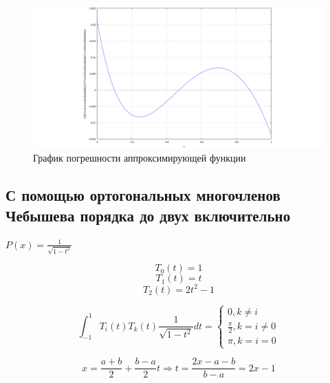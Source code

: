 \begin{figure}[H]
	\begin{center}
		\includegraphics[width=19cm]{e_legandre.png}
		\caption{График погрешности аппроксимирующей функции} 
		\label{pic:2:3:2}
	\end{center}
\end{figure}

\newpage

\subsection{С помощью ортогональных многочленов Чебышева порядка до двух включительно}

$P(x) = \frac{1}{\sqrt{1 - t^2}}$

\begin{displaymath}
T_0(t) = 1
\end{displaymath}
\begin{displaymath}
T_1(t) = t
\end{displaymath}
\begin{displaymath}
T_2(t) = 2t^2 - 1
\end{displaymath}

\begin{displaymath}
\int_{-1}^{1} T_i(t) T_k(t) \frac{1}{\sqrt{1 - t^2}} dt = \begin{cases} 0, k \neq i \\ \frac{\pi}{2}, k = i \neq 0 \\ \pi, k = i = 0 \end{cases}
\end{displaymath}

\begin{displaymath}
x = \frac{a + b}{2} + \frac{b - a}{2} t \Rightarrow t = \frac{2x - a - b}{b - a} = 2x - 1
\end{displaymath}

